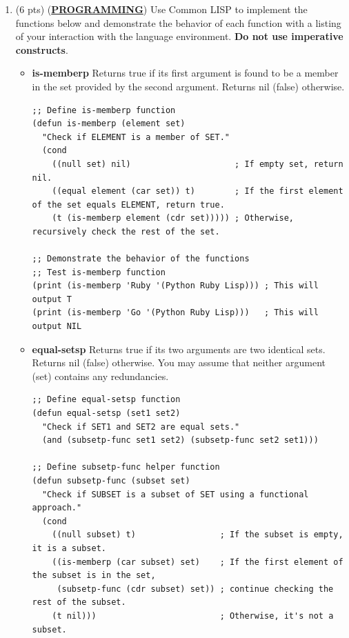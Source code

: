 \documentclass[12pt]{article}
\begin{document}
\begin{spacing}{1.5}
\begin{enumerate}
		\item (6 pts) (\textbf{\uline{{PROGRAMMING}}}) Use Common LISP to implement the functions below and demonstrate the behavior of each function with a listing of your interaction with the language environment. \textbf{Do not use imperative constructs}.
		      		      
		      \begin{itemize}
		      	\item \textbf{is-memberp} Returns true if its first argument is found to be a member in the set provided by the second argument. Returns nil (false) otherwise.
		      	      		      	      
		      	      \begin{lstlisting}
;; Define is-memberp function
(defun is-memberp (element set)
  "Check if ELEMENT is a member of SET."
  (cond
    ((null set) nil)                     ; If empty set, return nil.
    ((equal element (car set)) t)        ; If the first element of the set equals ELEMENT, return true.
    (t (is-memberp element (cdr set))))) ; Otherwise, recursively check the rest of the set.

;; Demonstrate the behavior of the functions
;; Test is-memberp function
(print (is-memberp 'Ruby '(Python Ruby Lisp))) ; This will output T
(print (is-memberp 'Go '(Python Ruby Lisp)))   ; This will output NIL
		      	      \end{lstlisting}
		      	      		      	      
		      	      		      	      
		      	      		      	                      
		      	\item \textbf{equal-setsp} Returns true if its two arguments are two identical sets. Returns nil (false) otherwise. You may assume that neither argument (set) contains any redundancies.
		      	      		      	      
		      	      \begin{lstlisting}
;; Define equal-setsp function
(defun equal-setsp (set1 set2)
  "Check if SET1 and SET2 are equal sets."
  (and (subsetp-func set1 set2) (subsetp-func set2 set1)))

;; Define subsetp-func helper function
(defun subsetp-func (subset set)
  "Check if SUBSET is a subset of SET using a functional approach."
  (cond
    ((null subset) t)                 ; If the subset is empty, it is a subset.
    ((is-memberp (car subset) set)    ; If the first element of the subset is in the set,
     (subsetp-func (cdr subset) set)) ; continue checking the rest of the subset.
    (t nil)))                         ; Otherwise, it's not a subset.


\end{lstlisting}
\end{itemize}
\end{enumerate}
\end{spacing}
\end{document}
